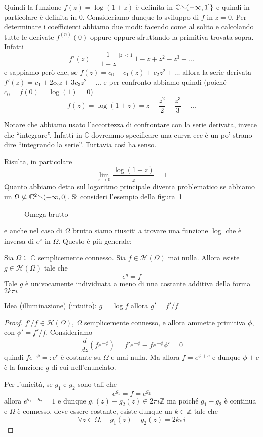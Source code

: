 Quindi la funzione \(f{(z)} = \log{(1 + z)}\) è definita in \(\mathbb{C} \sminus
(-\infty, 1]\}\) e quindi in particolare è definita in 0. Consideriamo dunque lo
sviluppo di \(f\) in \(z = 0\). Per determinare i coefficienti abbiamo due modi:
facendo come al solito e calcolando tutte le derivate \(f^{{(n)}}{(0)}\) oppure
oppure sfruttando la primitiva trovata sopra. Infatti
\[
  f'{(z)} = \frac{1}{1 + z} \overset{|z| < 1}{=} 1 - z + z^2 - z^3 + \dots
\]
e sappiamo però che, se \(f{(z)} = c_{0} + c_{1}{(z)} + c_{2}z^2 +\dots\) allora
la serie derivata \(f'{(z)} = c_{1} + 2c_{2}z +3c_{3}z^2 +\dots\) e per confronto
abbiamo quindi (poiché \(c_{0} = f{(0)} = \log{(1)} = 0\))
\[
    f{(z)} = \log{(1 + z)} = z - \frac{z^2}{2} + \frac{z^3}{3} - \dots
\]
\begin{remark}
    Notare che abbiamo usato l'accortezza di confrontare con la serie derivata,
    invece che ``integrare''. Infatti in \(\mathbb{C}\) dovremmo specificare
    una curva ecc è un po' strano dire ``integrando la serie''. Tuttavia così ha
    senso.
\end{remark}
Risulta, in particolare
\[
  \lim_{z \to 0} \frac{\log{(1 + z)}}{z} = 1
\]
Quanto abbiamo detto sul logaritmo principale diventa problematico se abbiamo un
\(\Omega \not\subseteq \mathbb{C}^2 \sminus (-\infty, 0]\). Si consideri
l'esempio della figura~\ref{fig:omega-brutto}
\begin{figure}[ht]
    \centering
    \caption{Omega brutto}
    \label{fig:omega-brutto}
\end{figure} %
e anche nel caso di \(\Omega\) brutto siamo riusciti a trovare una funzione
\(\log\) che è inversa di \(e^{z}\) in \(\Omega\). Questo è più generale:
\begin{theorem}
    Sia \(\Omega \subseteq \mathbb{C} \) semplicemente connesso. Sia \(f \in
    \mathcal{H}{(\Omega)}\) mai nulla. Allora esiste \(g \in
    \mathcal{H}{(\Omega)}\) tale che
    \[
      e^{g} = f
    \]
    Tale \(g\) è univocamente individuata a meno di una costante additiva della
    forma \(2k\pi i\) 
\end{theorem}
Idea (illuminazione) (intuito): \(g = \log f\) allora \(g' = f' / f\)
\begin{proof}
    \(f' / f \in \mathcal{H}{(\Omega)}\), \(\Omega\) semplicemente connesso, e
    allora ammette primitiva \(\phi\), con \(\phi' = f' / f\). Consideriamo
    \[
        \frac{d}{dz}{(f e ^{-\phi})} = f' e^{-\phi} - f e^{-\phi} \phi' =0
    \]
    quindi \(f e^{-\phi} =: e^{c}\) è costante su \(\Omega\) e mai nulla. Ma
    allora \(f = e^{\phi + c}\) e dunque \(\phi + c\) è la funzione \(g\) di cui
    nell'enunciato.

    Per l'unicità, se \(g_{1}\) e \(g_{2}\) sono tali che
    \[
      e^{g_{1}} = f = e^{g_{2}}
    \] allora \(e^{g_{1} - g_{2}} = 1\) e dunque \(g_{1}{(z)} - g_{2}{(z)} \in
    2\pi i \mathbb{Z}\) ma poiché \(g_{1} - g_{2}\) è continua e \(\Omega\) è
    connesso, deve essere costante, esiste dunque un \(k \in \mathbb{Z}\) tale
    che
    \[
      \forall  z \in \Omega, \quad g_{1}{(z)} - g_{2}{(z)} = 2k\pi i 
    \]
\end{proof}
